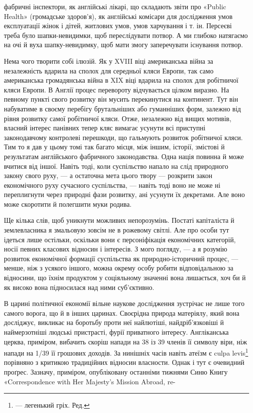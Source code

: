 фабричні інспектори, як англійські лікарі, що складають звіти
про «Public Health» (громадське здоров’я), як англійські комісари
для дослідження умов експлуатації жінок і дітей, житлових
умов, умов харчування і т. ін. Персеєві треба було шапки-невидимки,
щоб переслідувати потвор. А ми глибоко натягаємо на очі
й вуха шапку-невидимку, щоб мати змогу заперечувати існування
потвор.

Нема чого творити собі ілюзій. Як у XVIII віці американська
війна за незалежність вдарила на сполох для середньої кляси
Европи, так само американська громадянська війна в XIX віці
вдарила на сполох для робітничої кляси Европи. В Англії процес
перевороту відчувається цілком виразно. На певному пункті свого
розвитку він мусить перекинутися на континент. Тут він набуватиме
в своєму перебігу брутальніших або гуманніших форм, залежно
від рівня розвитку самої робітничої кляси. Отже, незалежно
від вищих мотивів, власний інтерес панівних тепер кляс вимагає
усунути всі приступні законодавчому контролеві перешкоди, що
гальмують розвиток робітничої кляси. Тим то я дав у цьому
томі так багато місця, між іншим, історії, змістові й результатам
англійського фабричного законодавства. Одна нація повинна й
може вчитися від іншої. Навіть тоді, коли суспільство напало на
слід природного закону свого руху, — а остаточна мета цього
твору — розкрити закон економічного руху сучасного суспільства,
— навіть тоді воно не може ні переплигнути через природні
фази розвитку, ані усунути їх декретами. Але воно може скоротити
й полегшити муки родива.

Ще кілька слів, щоб уникнути можливих непорозумінь. Постаті
капіталіста й землевласника я змальовую зовсім не в рожевому
світлі. Але про особи тут ідеться лише остільки, оскільки вони є
персоніфікація економічних категорій, носії певних класових
відносин і інтересів. З мого погляду, — а я розумію розвиток економічної
формації суспільства як природно-історичний процес, —
менше, ніж з усякого іншого, можна окрему особу робити відповідальною
за відносини, що їхнім продуктом у соціяльному значенні
вона лишається, хоч би й як високо вона підносилася над
ними суб’єктивно.

В царині політичної економії вільне наукове дослідження
зустрічає не лише того самого ворога, що й в інших царинах.
Своєрідна природа матеріялу, який вона досліджує, викликає на
боротьбу проти неї найлютіші, найдріб’язковіші й наймерзотніші
людські пристрасті, фурії приватного інтересу. Англіканська
церква, приміром, вибачить скоріш напади на 38 із 39 членів
її символу віри, ніж напади на 1/39 її грошових доходів. За нинішніх
часів навіть атеїзм є culpa levis\footnote*{
— легенький гріх. Ред.
} порівняно з критикою
традиційних відносин власности. Однак і тут є очевидний проґрес.
Зазначу, приміром, опубліковану останніми тижнями Синю
Книгу «Correspondence with Her Majesty’s Mission Abroad, re-